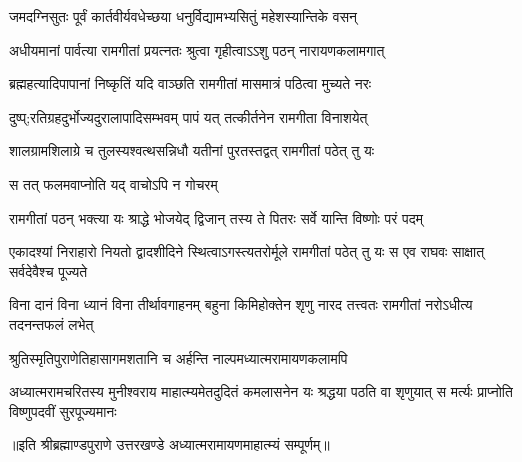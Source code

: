 \twolineshloka
{जमदग्निसुतः पूर्वं कार्तवीर्यवधेच्छया}
{धनुर्विद्यामभ्यसितुं महेशस्यान्तिके वसन्} %

\twolineshloka
{अधीयमानां पार्वत्या रामगीतां प्रयत्नतः}
{श्रुत्वा गृहीत्वाऽऽशु पठन् नारायणकलामगात्} %

\twolineshloka
{ब्रह्महत्यादिपापानां निष्कृतिं यदि वाञ्छति}
{रामगीतां मासमात्रं पठित्वा मुच्यते नरः} %

\twolineshloka
{दुष्प्;रतिग्रहदुर्भोज्यदुरालापादिसम्भवम्}
{पापं यत् तत्कीर्तनेन रामगीता विनाशयेत्} %

\twolineshloka
{शालग्रामशिलाग्रे च तुलस्यश्वत्थसन्निधौ}
{यतीनां पुरतस्तद्वत् रामगीतां पठेत् तु यः} %

\onelineshloka
{स तत् फलमवाप्नोति यद् वाचोऽपि न गोचरम्} %

\twolineshloka
{रामगीतां पठन् भक्त्या यः श्राद्धे भोजयेद् द्विजान्}
{तस्य ते पितरः सर्वे यान्ति विष्णोः परं पदम्} %

\threelineshloka
{एकादश्यां निराहारो नियतो द्वादशीदिने}
{स्थित्वाऽगस्त्यतरोर्मूले रामगीतां पठेत् तु यः}
{स एव राघवः साक्षात् सर्वदेवैश्च पूज्यते} %

\threelineshloka
{विना दानं विना ध्यानं विना तीर्थावगाहनम्}
{बहुना किमिहोक्तेन शृणु नारद तत्त्वतः}
{रामगीतां नरोऽधीत्य तदनन्तफलं लभेत्} %

\twolineshloka
{श्रुतिस्मृतिपुराणेतिहासागमशतानि च}
{अर्हन्ति नाल्पमध्यात्मरामायणकलामपि} %

\fourlineindentedshloka
{अध्यात्मरामचरितस्य मुनीश्वराय}
{माहात्म्यमेतदुदितं कमलासनेन}
{यः श्रद्धया पठति वा शृणुयात् स मर्त्यः}
{प्राप्नोति विष्णुपदवीं सुरपूज्यमानः} %

{॥इति श्रीब्रह्माण्डपुराणे उत्तरखण्डे अध्यात्मरामायणमाहात्म्यं सम्पूर्णम्॥
}

